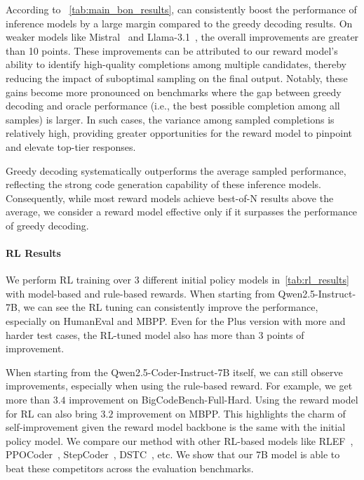 According to ~\autoref{tab:main_bon_results}, \RM can consistently boost the performance of inference models by a large margin compared to the greedy decoding results. On weaker models like Mistral~\citep{mistral7binstructv03} and Llama-3.1~\citep{zheng2024llamafactory}, the overall improvements are greater than 10 points. These improvements can be attributed to our reward model’s ability to identify high-quality completions among multiple candidates, thereby reducing the impact of suboptimal sampling on the final output. Notably, these gains become more pronounced on benchmarks where the gap between greedy decoding and oracle performance (i.e., the best possible completion among all samples) is larger. In such cases, the variance among sampled completions is relatively high, providing greater opportunities for the reward model to pinpoint and elevate top-tier responses.

Greedy decoding systematically outperforms the average sampled performance, reflecting the strong code generation capability of these inference models. Consequently, while most reward models achieve best-of-N results above the average, we consider a reward model effective only if it surpasses the performance of greedy decoding.

\paragraph{RL Results}
We perform RL training over 3 different initial policy models in~\autoref{tab:rl_results} with model-based and rule-based rewards. When starting from Qwen2.5-Instruct-7B, we can see the RL tuning can consistently improve the performance, especially on HumanEval and MBPP. Even for the Plus version with more and harder test cases, the RL-tuned model also has more than $3$ points of improvement. 

When starting from the Qwen2.5-Coder-Instruct-7B itself, we can still observe improvements, especially when using the rule-based reward. For example, we get more than $3.4$ improvement on BigCodeBench-Full-Hard. Using the reward model for RL can also bring $3.2$ improvement on MBPP. This highlights the charm of self-improvement given the reward model backbone is the same with the initial policy model. We compare our method with other RL-based models like RLEF~\citep{rlef}, PPOCoder~\citep{PPOCoder}, StepCoder~\citep{stepcoder}, DSTC~\citep{dstc}, etc. We show that our 7B model is able to beat these competitors across the evaluation benchmarks.

